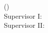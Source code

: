 \begin{center}
  \textbf{\MakeUppercase{\judulInggris}}\par
  \vspace{0.4cm}
  \MakeUppercase{\namaPenulis} (\nomorInduk)\\
  Supervisor I: \pembimbingSatu\\
  Supervisor II: \pembimbingDua
\end{center}
